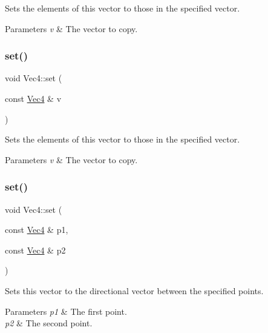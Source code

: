Sets the elements of this vector to those in the specified vector.


\begin{DoxyParams}{Parameters}
{\em v} & The vector to copy. \\
\hline
\end{DoxyParams}
\mbox{\label{classVec4_ab247286076dd5b9d7d88e8b5a73d636a}} 
\subsubsection{\texorpdfstring{set()}{set()}\hspace{0.1cm}{\footnotesize\ttfamily [6/8]}}
{\footnotesize\ttfamily void Vec4\+::set (\begin{DoxyParamCaption}\item[{const \hyperlink{classVec4}{Vec4} \&}]{v }\end{DoxyParamCaption})}

Sets the elements of this vector to those in the specified vector.


\begin{DoxyParams}{Parameters}
{\em v} & The vector to copy. \\
\hline
\end{DoxyParams}
\mbox{\label{classVec4_aaaaf92933c49b13b060f2bdf063fa430}} 
\subsubsection{\texorpdfstring{set()}{set()}\hspace{0.1cm}{\footnotesize\ttfamily [7/8]}}
{\footnotesize\ttfamily void Vec4\+::set (\begin{DoxyParamCaption}\item[{const \hyperlink{classVec4}{Vec4} \&}]{p1,  }\item[{const \hyperlink{classVec4}{Vec4} \&}]{p2 }\end{DoxyParamCaption})}

Sets this vector to the directional vector between the specified points.


\begin{DoxyParams}{Parameters}
{\em p1} & The first point. \\
\hline
{\em p2} & The second point. \\
\hline
\end{DoxyParams}
\mbox{\label{classVec4_aaaaf92933c49b13b060f2bdf063fa430}} 
